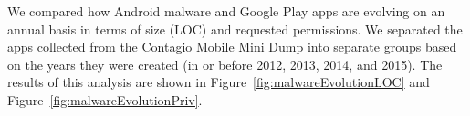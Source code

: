 \documentclass{sig-alternate-05-2015}
\begin{document}
%
%
%
%
%


We compared how Android malware and Google Play apps are evolving on an annual basis in terms of size (LOC) and requested permissions. We separated the apps collected from the Contagio Mobile Mini Dump into separate groups based on the years they were created (in or before 2012, 2013, 2014, and 2015). The results of this analysis are shown in Figure~\ref{fig:malwareEvolutionLOC} and Figure~\ref{fig:malwareEvolutionPriv}.



\end{document}
